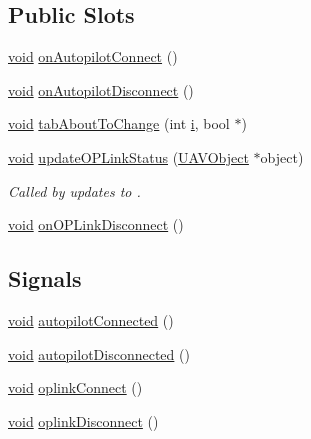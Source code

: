 \subsection*{\-Public \-Slots}
\begin{DoxyCompactItemize}
\item 
\hyperlink{group___u_a_v_objects_plugin_ga444cf2ff3f0ecbe028adce838d373f5c}{void} \hyperlink{group___config_plugin_ga4f8e913d92b646252bb6d82dfd028c52}{on\-Autopilot\-Connect} ()
\item 
\hyperlink{group___u_a_v_objects_plugin_ga444cf2ff3f0ecbe028adce838d373f5c}{void} \hyperlink{group___config_plugin_gaa57c964c58914d045daa972b9a1b87ce}{on\-Autopilot\-Disconnect} ()
\item 
\hyperlink{group___u_a_v_objects_plugin_ga444cf2ff3f0ecbe028adce838d373f5c}{void} \hyperlink{group___config_plugin_ga280d7130ca08f8974292483f6b017d72}{tab\-About\-To\-Change} (int \hyperlink{uavobjecttemplate_8m_a6f6ccfcf58b31cb6412107d9d5281426}{i}, bool $\ast$)
\item 
\hyperlink{group___u_a_v_objects_plugin_ga444cf2ff3f0ecbe028adce838d373f5c}{void} \hyperlink{group___config_plugin_ga818055c405858506c9ae07240e0bfad7}{update\-O\-P\-Link\-Status} (\hyperlink{class_u_a_v_object}{\-U\-A\-V\-Object} $\ast$object)
\begin{DoxyCompactList}\small\item\em \-Called by updates to . \end{DoxyCompactList}\item 
\hyperlink{group___u_a_v_objects_plugin_ga444cf2ff3f0ecbe028adce838d373f5c}{void} \hyperlink{group___config_plugin_gaec8bc8bcd267141edd1fee6ca08c3a97}{on\-O\-P\-Link\-Disconnect} ()
\end{DoxyCompactItemize}
\subsection*{\-Signals}
\begin{DoxyCompactItemize}
\item 
\hyperlink{group___u_a_v_objects_plugin_ga444cf2ff3f0ecbe028adce838d373f5c}{void} \hyperlink{group___config_plugin_ga5c7aaec226341fec654b07be4cdcd807}{autopilot\-Connected} ()
\item 
\hyperlink{group___u_a_v_objects_plugin_ga444cf2ff3f0ecbe028adce838d373f5c}{void} \hyperlink{group___config_plugin_ga1ba3ecc94d2a793f945493631cc7be34}{autopilot\-Disconnected} ()
\item 
\hyperlink{group___u_a_v_objects_plugin_ga444cf2ff3f0ecbe028adce838d373f5c}{void} \hyperlink{group___config_plugin_ga672206f813d7364dc6bd71140773c828}{oplink\-Connect} ()
\item 
\hyperlink{group___u_a_v_objects_plugin_ga444cf2ff3f0ecbe028adce838d373f5c}{void} \hyperlink{group___config_plugin_gad5ee6c6370ca04c5da447e4ba0304f0b}{oplink\-Disconnect} ()
\end{DoxyCompactItemize}
